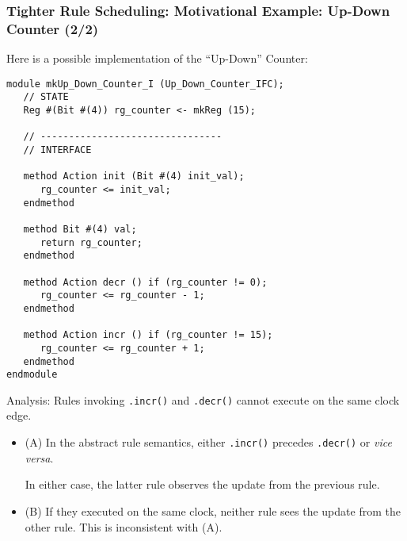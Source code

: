 \begin{frame}[fragile]
\frametitle{Tighter Rule Scheduling: Motivational Example: Up-Down Counter (2/2)}

\footnotesize

Here is a possible implementation of the ``Up-Down'' Counter:

\begin{minipage}{0.45\textwidth}\scriptsize
\begin{Verbatim}[frame=single]
module mkUp_Down_Counter_I (Up_Down_Counter_IFC);
   // STATE
   Reg #(Bit #(4)) rg_counter <- mkReg (15);

   // --------------------------------
   // INTERFACE

   method Action init (Bit #(4) init_val);
      rg_counter <= init_val;
   endmethod

   method Bit #(4) val;
      return rg_counter;
   endmethod

   method Action decr () if (rg_counter != 0);
      rg_counter <= rg_counter - 1;
   endmethod

   method Action incr () if (rg_counter != 15);
      rg_counter <= rg_counter + 1;
   endmethod
endmodule
\end{Verbatim}
\end{minipage}
\hm
\begin{minipage}{0.5\textwidth}

Analysis: Rules invoking {\tt .incr()} and {\tt .decr()} cannot execute on the same clock edge.

\begin{itemize}\scriptsize

 \item (A) In the abstract rule semantics, either {\tt .incr()}
       precedes {\tt .decr()} or \emph{vice versa}.

       \vspace{1ex}

       In either case, the latter rule observes the update from the previous rule.

       \vspace{2ex}

 \item (B) If they executed on the same clock, neither rule sees the
       update from the other rule.  This is inconsistent with (A).

\end{itemize}

\vspace{1ex}


\end{minipage}
\end{frame}
